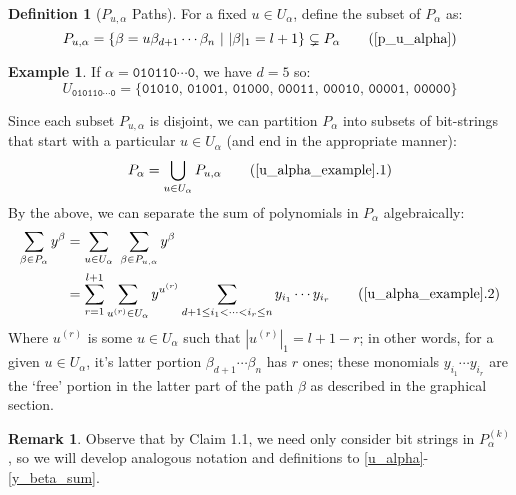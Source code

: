\documentclass[12pt,reqno]{amsart}
\theoremstyle{plain}
\theoremstyle{definition}
\newtheorem{example}[theorem]{Example}
\newtheorem{remark}[theorem]{Remark}
\newtheorem{definition}[theorem]{Definition}
\begin{document}
\begin{definition}[$P_{u, \alpha}$ Paths] \label{p_u_alpha}
	For a fixed $u \in U_{\alpha}$, define the subset of $P_\alpha$ as:
	\begin{equation}
		P_{u, \alpha} = \{ \beta = u \beta_{d+1} \cdots \beta_n \ |   \ |\beta|_1 = l+1\} \subsetneq P_\alpha
		\tag{\ref*{p_u_alpha}}
	\end{equation}
\end{definition}

\begin{example} \label{u_alpha_example}
	If $\alpha = \texttt{010110} \cdots \texttt{0}$, we have $d=5$ so:
	\begin{equation*} 
		U_{\texttt{010110} \cdots \texttt{0}} = \{\texttt{01010, 01001, 01000, 00011, 00010, 00001, 00000}\}
	\end{equation*}
\end{example} 
Since each subset $P_{u, \alpha}$ is disjoint, we can partition $P_\alpha$ into subsets of bit-strings that start with a particular $u \in U_\alpha$ (and end in the appropriate manner):
\begin{equation} \label{p_alpha_union}
	P_\alpha = \bigcup_{u \in U_\alpha} P_{u,\alpha} \tag{\ref*{u_alpha_example}.1}
\end{equation}
By the above, we can separate the sum of polynomials in $P_\alpha$ algebraically:
\begin{align*} \label{y_beta_sum}
	\sum_{\beta \in P_\alpha} y^ \beta  &= \sum_{u \in U_\alpha} \  \sum_{\beta \in P_{u,\alpha}} y^\beta \\ 
										&= \sum_{r=1}^{l+1} \sum_{u^{(r)} \in U_\alpha} y^{u^{(r)}} 
										\sum_{d+1 \leq i_1 < \cdots < i_r \leq n} y_{i_1} \cdots y_{i_{r}}   
										\tag{\ref*{u_alpha_example}.2}
\end{align*} 
Where $u^{(r)}$ is some $u \in U_\alpha$ such that  $|u^{(r)}|_1  = l + 1 -r$; in other words, for a given $u \in U_\alpha$, it's latter portion $\beta_{d+1} \cdots \beta_{n}$ has $r$ ones; these monomials $y_{i_1} \cdots y_{i_r}$ are the `free' portion in the latter part of the path $\beta$ as described in the graphical section.

\begin{remark}
	Observe that by Claim 1.1, we need only consider bit strings in $P_{\alpha}^{(k)}$, so we will develop analogous notation and definitions to \ref{u_alpha}-\ref{y_beta_sum}.
\end{remark}
\end{document}
